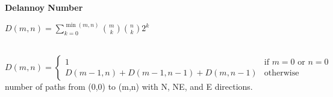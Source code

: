 \begin{large}
  \textbf{Delannoy Number} \\
  \begin{Large}
    ${\displaystyle D(m,n)=\sum _{k=0}^{\min(m,n)}{\binom {m}{k}}{\binom {n}{k}}2^{k}}$
  \end{Large} \\
  $D(m,n)=\begin{cases}1 &\text{if }m=0\text{ or }n=0\\D(m-1,n) + D(m-1,n-1) + D(m,n-1)&\text{otherwise}\end{cases}$ \\
  number of paths from (0,0) to (m,n) with N, NE, and E directions.
\end{large} \\
